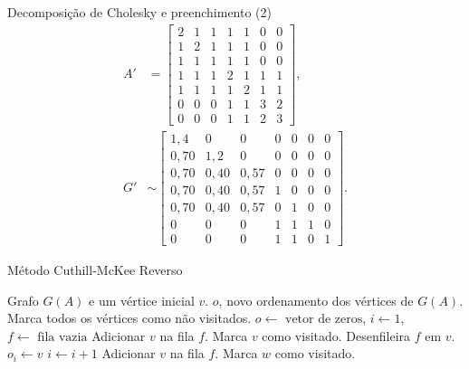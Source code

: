 \documentclass[10pt]{beamer}
\begin{document}
\begin{frame}{Decomposição de Cholesky e preenchimento (2)}
  \begin{align*}
      A' &= \begin{bmatrix}
          2 & 1 & 1 & 1 & 1 & 0 & 0 \\
          1 & 2 & 1 & 1 & 1 & 0 & 0 \\
          1 & 1 & 1 & 1 & 1 & 0 & 0 \\
          1 & 1 & 1 & 2 & 1 & 1 & 1 \\
          1 & 1 & 1 & 1 & 2 & 1 & 1 \\
          0 & 0 & 0 & 1 & 1 & 3 & 2 \\
          0 & 0 & 0 & 1 & 1 & 2 & 3
      \end{bmatrix}, \\
      G' &\sim \begin{bmatrix}
          1,4 & 0 & 0 & 0 & 0 & 0 & 0 \\
          0,70 & 1,2 & 0 & 0 & 0 & 0 & 0 \\
          0,70 & 0,40 & 0,57 & 0 & 0 & 0 & 0 \\
          0,70 & 0,40 & 0,57 & 1 & 0 & 0 & 0 \\
          0,70 & 0,40 & 0,57 & 0 & 1 & 0 & 0 \\
          0 & 0 & 0 & 1 & 1 & 1 & 0 \\
          0 & 0 & 0 & 1 & 1 & 0 & 1
      \end{bmatrix}.
  \end{align*}
\end{frame}

\begin{frame}[fragile]{Método Cuthill-McKee Reverso}
  \begin{algorithmic}[1]
      \REQUIRE Grafo $G(A)$ e um vértice inicial $v$.
      \ENSURE $o$, novo ordenamento dos vértices de $G(A)$.
      \STATE Marca todos os vértices como não visitados.
      \STATE $o \longleftarrow \text{ vetor de zeros}$, $i \longleftarrow
      1$, $f \longleftarrow \text{ fila vazia}$
      \STATE Adicionar $v$ na fila $f$.
      \STATE Marca $v$ como visitado.
          \STATE Desenfileira $f$ em $v$.
          \STATE $o_i \longleftarrow v$
          \STATE $i \longleftarrow i + 1$
                  \STATE Adicionar $v$ na fila $f$.
                  \STATE Marca $w$ como visitado.
              \ENDIF
          \ENDFOR
      \ENDWHILE
  \end{algorithmic}
\end{frame}
\end{document}
